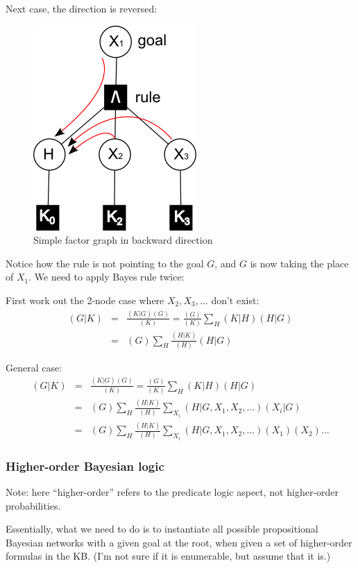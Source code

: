 Next case, the direction is reversed:
\begin{figure}[H]
\centering
\includegraphics{simple-proof-tree3.png}
\caption{Simple factor graph in backward direction}
\end{figure}
Notice how the rule is not pointing to the goal $G$, and $G$ is now taking the place of $X_1$.  We need to apply Bayes rule twice:

First work out the 2-node case where $X_2, X_3, ...$ don't exist:\\
\begin{eqnarray*}
(G|K) &=& \frac{(K|G)(G)}{(K)} = \frac{(G)}{(K)} \sum_H (K|H)(H|G) \nonumber\\
      &=& (G) \sum_H \frac{(H|K)}{(H)} (H|G)
\end{eqnarray*}

General case:\\
\begin{eqnarray*}
(G|K) &=& \frac{(K|G)(G)}{(K)} = \frac{(G)}{(K)} \sum_H (K|H)(H|G) \nonumber\\
      &=& (G) \sum_H \frac{(H|K)}{(H)} \sum_{X_i} (H|G,X_1,X_2,...)(X_i|G) \nonumber\\
      &=& (G) \sum_H \frac{(H|K)}{(H)} \sum_{X_i} (H|G,X_1,X_2,...)(X_1)(X_2)...
\end{eqnarray*}

\subsubsection{Higher-order Bayesian logic}

Note:  here ``higher-order'' refers to the predicate logic aspect, not higher-order probabilities.

Essentially, what we need to do is to instantiate all possible propositional Bayesian networks with a given goal at the root, when given a set of higher-order formulas in the KB.  (I'm not sure if it is enumerable, but assume that it is.)

